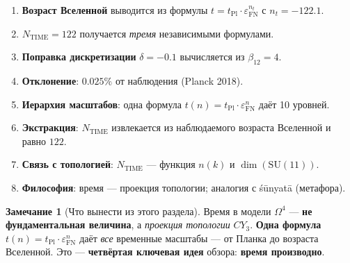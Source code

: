 \documentclass[11pt,a4paper]{article}
\newcommand{\SU}{\mathrm{SU}}
\newcommand{\CY}{CY_3}
\newcommand{\Om}{\Omega^4}
\newcommand{\epsFN}{\varepsilon_{\text{FN}}}
\theoremstyle{definition}
\newtheorem{remark}[theorem]{Замечание}
\begin{document}
\begin{enumerate}
    \item \textbf{Возраст Вселенной} выводится из формулы 
          $t = t_{\text{Pl}} \cdot \epsFN^{n_t}$ с 
          $n_t = -122.1$.
    \item \textbf{$N_{\text{TIME}} = 122$} получается \emph{тремя} 
          независимыми формулами.
    \item \textbf{Поправка дискретизации} $\delta = -0.1$ 
          вычисляется из $\beta_{12} = 4$.
    \item \textbf{Отклонение}: $0.025\%$ от наблюдения 
          (Planck 2018).
    \item \textbf{Иерархия масштабов}: одна формула 
          $t(n) = t_{\text{Pl}} \cdot \epsFN^n$ даёт 10 уровней.
    \item \textbf{Экстракция}: $N_{\text{TIME}}$ извлекается 
          из наблюдаемого возраста Вселенной и равно $122$.
    \item \textbf{Связь с топологией}: $N_{\text{TIME}}$ — 
          функция $n(k)$ и $\dim(\SU(11))$.
    \item \textbf{Философия}: время — проекция топологии; 
          аналогия с śūnyatā (метафора).
\end{enumerate}

\begin{remark}[Что вынести из этого раздела]
\label{rem:time-takeaway}
Время в модели $\Om$ — \textbf{не фундаментальная величина}, 
а \emph{проекция топологии} $\CY$. \textbf{Одна формула} 
$t(n) = t_{\text{Pl}} \cdot \epsFN^n$ даёт \emph{все} временные 
масштабы — от Планка до возраста Вселенной. Это — 
\textbf{четвёртая ключевая идея} обзора: \textbf{время производно}.
\end{remark}
\end{document}
